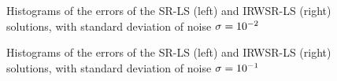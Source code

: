 \begin{figure}%
\centering
\caption{Histograms of the errors of the SR-LS (left) and IRWSR-LS (right) solutions,  with standard deviation of noise $\protect\sigma = 10^{-2}$}
\label{fig:Noise02IRW}
\end{figure}

\newpage

\begin{figure}[h]%
\centering
\caption{Histograms of the errors of the SR-LS (left) and IRWSR-LS (right) solutions,  with standard deviation of noise  $\protect\sigma = 10^{-1}$}
\label{fig:Noise01IRW}
\end{figure}

